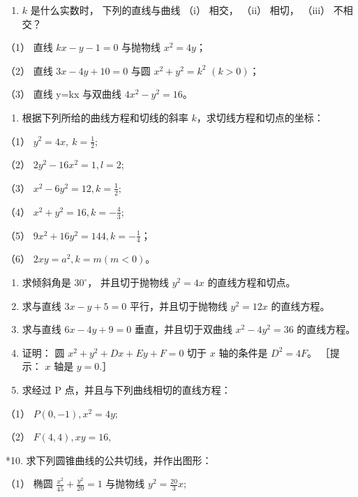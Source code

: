 \begin{enumerate}
\def\labelenumi{\arabic{enumi}.}
\setcounter{enumi}{2}
\tightlist
\item
  \(k\) 是什么实数时， 下列的直线与曲线 （i） 相交， （ii） 相切，
  （iii） 不相交？
\end{enumerate}

（1） 直线 \(kx - y - 1 = 0\) 与抛物线 \(x^{2} = 4y\)；

（2） 直线 \(3x - 4y + 10 = 0\) 与圆 \(x^{2} + y^{2} = k^{2}\)
\((k > 0)\)；

（3） 直线 y=kx 与双曲线 \(4x^{2}-y^{2}=16\)。

\begin{enumerate}
\def\labelenumi{\arabic{enumi}.}
\setcounter{enumi}{3}
\tightlist
\item
  根据下列所给的曲线方程和切线的斜率 \(k\)，求切线方程和切点的坐标：
\end{enumerate}

（1） \(y^{2}=4x,\ k=\frac{1}{2};\)

（2） \(2y^{2} - 16x^{2} = 1, l = 2;\)

（3） \(x^{2} - 6y^{2} = 12, k = \frac{1}{2};\)

（4） \(x^{2} + y^{2} = 16, k = -\frac{4}{3};\)

（5） \(9x^{2} + 16y^{2} = 144, k = -\frac{1}{4}\)；

（6） \(2xy = a^2, k = m (m < 0)\)。

\begin{enumerate}
\def\labelenumi{\arabic{enumi}.}
\setcounter{enumi}{4}
\item
  求倾斜角是 \(30^{\circ}\)， 并且切于抛物线 \(y^{2} = 4x\)
  的直线方程和切点。
\item
  求与直线 \(3x - y + 5 = 0\) 平行，并且切于抛物线 \(y^{2} = 12x\)
  的直线方程。
\item
  求与直线 \(6x - 4y + 9 = 0\) 垂直，并且切于双曲线
  \(x^{2} - 4y^{2} = 36\) 的直线方程。
\item
  证明： 圆 \(x^{2} + y^{2} + Dx + Ey + F = 0\) 切于 \(x\) 轴的条件是
  \(D^{2} = 4F\)。 ［提示： \(x\) 轴是 \(y = 0\).］
\item
  求经过 P 点，并且与下列曲线相切的直线方程：
\end{enumerate}

（1） \(P(0, -1), x^2 = 4y;\)

（2） \(F(4, 4), xy = 16,\)

*10. 求下列圆锥曲线的公共切线，并作出图形：

（1） 椭圆 \(\frac{x^{2}}{45} + \frac{y^{2}}{20} = 1\) 与抛物线
\(y^{2} = \frac{20}{3} x;\)

